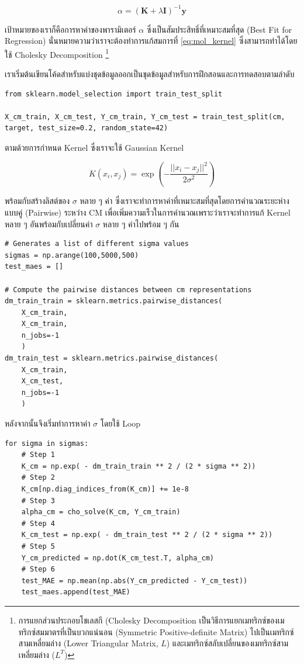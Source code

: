 \begin{equation}\label{eq:mol_kernel}
    \alpha = (\mathbf{K} + \lambda\mathbf{I} ) ^{-1} \mathbf{y}
\end{equation}

\noindent เป้าหมายของเราก็คือการหาค่าของพารามิเตอร์ $\alpha$ ซึ่งเป็นสัมประสิทธิ์ที่เหมาะสมที่สุด (Best Fit for Regression) 
นั่นหมายความว่าเราจะต้องทำการแก้สมการที่ \ref{eq:mol_kernel} ซึ่งสามารถทำได้โดยใช้ Cholesky Decomposition%
\footnote{การแยกส่วนประกอบโชเลสกี (Cholesky Decomposition เป็นวิธีการแยกเมทริกซ์ของเมทริกซ์สมมาตรที่เป็นบวกแน่นอน (Symmetric 
Positive-definite Matrix) ไปเป็นเมทริกซ์สามเหลี่ยมล่าง (Lower Triangular Matrix, $L$) และเมทริกซ์สลับเปลี่ยนของเมทริกซ์สาม%
เหลี่ยมล่าง ($L^{T}$)}

เราเริ่มต้นเขียนโค้ดสำหรับแบ่งชุดข้อมูลออกเป็นชุดข้อมูลสำหรับการฝึกสอนและการทดสอบตามลำดับ
\begin{lstlisting}[style=MyPython]
from sklearn.model_selection import train_test_split

X_cm_train, X_cm_test, Y_cm_train, Y_cm_test = train_test_split(cm, target, test_size=0.2, random_state=42)
\end{lstlisting}

\noindent ตามด้วยการกำหนด Kernel ซึ่งเราจะใช้ Gaussian Kernel 

\begin{equation}\label{eq:gaussian_kernel}
    K(x_{i}, x_{j}) = \exp \left( -\frac{||x_{i}-x_{j}||^2}{2\sigma^2} \right)
\end{equation}

\noindent พร้อมกับสร้างลิสต์ของ $\sigma$ หลาย ๆ ค่า ซึ่งเราจะทำการหาค่าที่เหมาะสมที่สุดโดยการคำนวณระยะห่างแบบคู่ (Pairwise) 
ระหว่าง CM เพื่อเพิ่มความเร็วในการคำนวณเพราะว่าเราจะทำการแก้ Kernel หลาย ๆ อันพร้อมกับเปลี่ยนค่า $\sigma$ หลาย ๆ ค่าไปพร้อม ๆ กัน

\begin{lstlisting}[style=MyPython]
# Generates a list of different sigma values
sigmas = np.arange(100,5000,500) 
test_maes = []

# Compute the pairwise distances between cm representations
dm_train_train = sklearn.metrics.pairwise_distances(
    X_cm_train, 
    X_cm_train, 
    n_jobs=-1
    )
dm_train_test = sklearn.metrics.pairwise_distances(
    X_cm_train, 
    X_cm_test, 
    n_jobs=-1
    )
\end{lstlisting}

\noindent หลังจากนั้นจึงเริ่มทำการหาค่า $\sigma$ โดยใช้ Loop

\begin{lstlisting}[style=MyPython]
for sigma in sigmas:
    # Step 1
    K_cm = np.exp( - dm_train_train ** 2 / (2 * sigma ** 2)) 
    # Step 2
    K_cm[np.diag_indices_from(K_cm)] += 1e-8
    # Step 3
    alpha_cm = cho_solve(K_cm, Y_cm_train)
    # Step 4
    K_cm_test = np.exp( - dm_train_test ** 2 / (2 * sigma ** 2))
    # Step 5
    Y_cm_predicted = np.dot(K_cm_test.T, alpha_cm)
    # Step 6
    test_MAE = np.mean(np.abs(Y_cm_predicted - Y_cm_test))
    test_maes.append(test_MAE)
\end{lstlisting}

